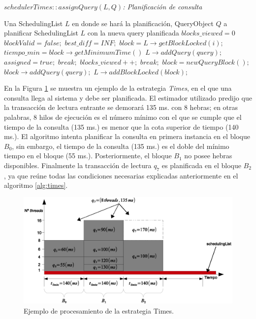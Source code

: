\begin{algorithm}[tp]
\caption{\em $schedulerTimes::assignQuery(L, Q)$: Planificación de consulta}
\label{alg:times}
\begin{algorithmic}[1]
\REQUIRE Una SchedulingList $L$ en donde se hará la planificación, QueryObject $Q$ a planificar
\ENSURE SchedulingList $L$ con la nueva query planificada	
	\STATE $blocks\_viewed = 0$
	\STATE $blockValid = false;$	
	\STATE $best\_diff = INF;$	
		\STATE $block = L \rightarrow getBlockLocked(i);$		
			\STATE $tiempo\_min = block \rightarrow getMinimumTime()$			
				\STATE $L \rightarrow addQuery(query);$
				\STATE $assigned = true;$
				\STATE $break;$
			\ENDIF						
			\STATE $blocks\_viewed++;$			
				\STATE $break;$
			\ENDIF			
		\ENDIF		
	\ENDFOR	
		\STATE $block = new QueryBlock();$
		\STATE $block \rightarrow addQuery(query);$
		\STATE $L \rightarrow addBlockLocked(block);$		
	\ENDIF	
\end{algorithmic}
\end{algorithm}

En la Figura \ref{fig:proceso_Times} se muestra un ejemplo de la estrategia \textit{Times}, en el que una consulta llega al sistema y debe ser planificada. El estimador utilizado predijo que la transacción de lectura entrante se demorará 135 ms. con 8 hebras; en otras palabras, 8 hilos de ejecución es el número mínimo con el que se cumple que el tiempo de la consulta (135 ms.) es menor que la cota superior de tiempo (140 ms.). El algoritmo intenta planificar la consulta en primera instancia en el bloque $B_0$, sin embargo, el tiempo de la consulta (135 ms.) es el doble del mínimo tiempo en el bloque (55 ms.). Posteriormente, el bloque $B_1$ no posee hebras disponibles. Finalmente la transacción de lectura $q_7$ es planificada en el bloque $B_2$, ya que reúne todas las condiciones necesarias explicadas anteriormente en el algoritmo \ref{alg:times}. 

\begin{figure}[tp]
\centering
\includegraphics[scale=.75]{images/proceso_Times.eps}
\caption{Ejemplo de procesamiento de la estrategia Times.}
\label{fig:proceso_Times}
\end{figure} 

